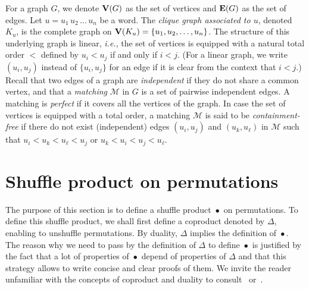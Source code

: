 \documentclass[a4paper]{llncs}
\DeclareMathOperator{\SHUFFLE}{\bullet}
\begin{document}
For a graph $G$, we denote $\mathbf{V}(G)$ as the set of vertices and
$\mathbf{E}(G)$ as the set of edges.
Let $u = u_1 \, u_2 \,\ldots\, u_n$ be a word.
The \emph{clique graph associated to $u$}, denoted $K_u$,
is the complete graph on $\mathbf{V}(K_u) = \{u_1, u_2, \ldots, u_n\}$.
The structure of this underlying graph is linear,
\emph{i.e.}, the set of vertices is equipped with a natural total order
$<$ defined by $u_i < u_j$ if and only if $i < j$.
(For a linear graph, we write $(u_i, u_j)$ instead of $\{u_i, u_j\}$
for an edge if it is clear from the context that $i < j$.)
Recall that two edges of a graph are \emph{independent} if they do not share
a common vertex, and that a \emph{matching} $\mathcal{M}$ in $G$ is a set of
pairwise independent edges.
A matching is \emph{perfect} if it covers all the vertices of the graph.
In case the set of vertices is equipped with a total order,
a matching $\mathcal{M}$ is said to be \emph{containment-free}
if there do not exist (independent) edges $(u_i, u_j)$ and
$(u_k, u_\ell)$ in $\mathcal{M}$ such that
$u_i < u_k < u_\ell < u_j$ or  $u_k < u_i < u_j < u_\ell$.


\section{Shuffle product on permutations}
\label{section:Shuffle product on permutations}

The purpose of this section is to define a shuffle product $\SHUFFLE$
on permutations. To define this shuffle product, we shall first define
a coproduct denoted by $\Delta$, enabling to unshuffle permutations.
By duality, $\Delta$ implies the definition of $\SHUFFLE$. The reason
why we need to pass by the definition of $\Delta$ to define $\SHUFFLE$
is justified by the fact that a lot of properties of $\SHUFFLE$ depend
of properties of $\Delta$ and that this strategy allows to write concise
and clear proofs of them. We invite the reader unfamiliar with the
concepts of coproduct and duality to consult~\cite{Joni:Rota:1979}
or~\cite{Grinberg:Reiner:2014}.
\medskip
\end{document}
